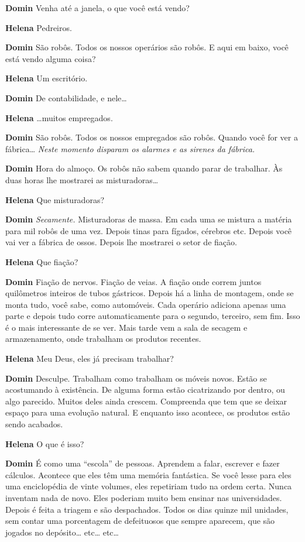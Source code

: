 \textbf{Domin} Venha até a janela, o que você está vendo?

\textbf{Helena} Pedreiros.

\textbf{Domin} São robôs. Todos os nossos operários são robôs. E aqui em baixo, você
está vendo alguma coisa?

\textbf{Helena} Um escritório.

\textbf{Domin} De contabilidade, e nele\ldots{}

\textbf{Helena} \ldots{}muitos empregados.

\textbf{Domin} São robôs. Todos os nossos empregados são robôs. Quando você for ver a
fábrica\ldots{} \emph{Neste momento disparam os alarmes e as sirenes da fábrica.}

\textbf{Domin} Hora do almoço. Os robôs não sabem quando parar de trabalhar. Às duas
horas lhe mostrarei as misturadoras\ldots{} 

\textbf{Helena} Que misturadoras?


\textbf{Domin} \emph{Secamente.} Misturadoras de massa. Em cada uma se mistura a
matéria para mil robôs de uma vez. Depois tinas para fígados, cérebros etc.
Depois você vai ver a fábrica de ossos. Depois lhe mostrarei o setor de fiação.

\textbf{Helena} Que fiação?

\textbf{Domin} Fiação de nervos. Fiação de veias. A fiação onde correm juntos
quilômetros inteiros de tubos gástricos. Depois há a linha de montagem, onde se monta
tudo, você sabe, como automóveis. Cada operário adiciona apenas uma parte e
depois tudo corre automaticamente para o segundo, terceiro, sem fim. Isso é o
mais interessante de se ver. Mais tarde vem a sala de secagem e armazenamento, onde
trabalham os produtos recentes.

\textbf{Helena} Meu Deus, eles já precisam trabalhar?

\textbf{Domin} Desculpe. Trabalham como trabalham os móveis novos. Estão se acostumando
à existência. De alguma forma estão cicatrizando por dentro, ou algo parecido.
Muitos deles ainda crescem. Compreenda que tem que se deixar espaço para uma
evolução natural. E enquanto isso acontece, os produtos estão sendo acabados.

\textbf{Helena} O que é isso?

\textbf{Domin} É como uma ``escola'' de pessoas. Aprendem a falar, escrever e fazer
cálculos. Acontece que eles têm uma memória fantástica. Se você lesse para eles
uma enciclopédia de vinte volumes, eles repetiriam tudo na ordem certa. Nunca
inventam nada de novo. Eles poderiam muito bem ensinar nas universidades. Depois
é feita a triagem e são despachados. Todos os dias quinze mil unidades, sem contar
uma porcentagem de defeituosos que sempre aparecem, que são jogados no
depósito\ldots{} etc\ldots{} etc\ldots{}

